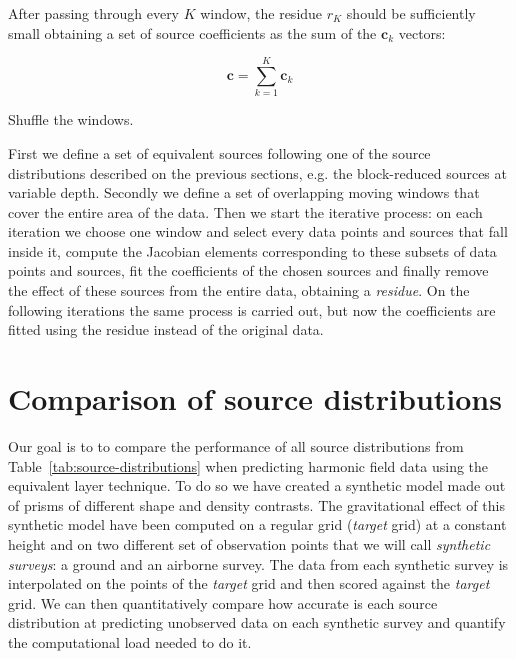 \documentclass[twocolumn]{article}
\begin{document}
After passing through every $K$ window, the residue $r_K$ should be
sufficiently small obtaining a set of source coefficients as the sum of the
$\mathbf{c}_k$ vectors:

\begin{equation}
    \mathbf{c} = \sum_{k=1}^K \mathbf{c}_k
\end{equation}

Shuffle the windows.

First we define a set of equivalent sources following one of the
source distributions described on the previous sections, e.g. the block-reduced
sources at variable depth. Secondly we define a set of overlapping moving
windows that cover the entire area of the data. Then we start the iterative
process: on each iteration we choose one window and select every data points
and sources that fall inside it, compute the Jacobian elements corresponding to
these subsets of data points and sources, fit the coefficients of the chosen
sources and finally remove the effect of these sources from the entire data,
obtaining a \emph{residue}. On the following iterations the same process is
carried out, but now the coefficients are fitted using the residue instead of
the original data.

\section{Comparison of source distributions}


Our goal is to to compare the performance of all source distributions from
Table~\ref{tab:source-distributions} when predicting harmonic field data using
the equivalent layer technique.
To do so we have created a synthetic model made out of prisms of different
shape and density contrasts.
The gravitational effect of this synthetic model have been computed on
a regular grid (\emph{target} grid) at a constant height and on two different
set of observation points that we will call \emph{synthetic surveys}: a ground
and an airborne survey.
The data from each synthetic survey is interpolated on the points of the
\emph{target} grid and then scored against the \emph{target} grid.
We can then quantitatively compare how accurate is each source distribution at
predicting unobserved data on each synthetic survey and quantify the
computational load needed to do it.
\end{document}
